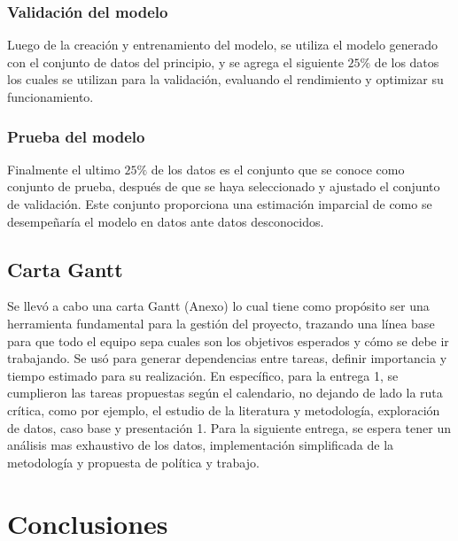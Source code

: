\documentclass[10pt]{article}
\begin{document}
\subsubsection{Validación del modelo}
Luego de la creación y entrenamiento del modelo, se utiliza el modelo generado con el conjunto de datos del principio, y se agrega el siguiente $25\%$ de los datos los cuales se utilizan para la validación, evaluando el rendimiento y optimizar su funcionamiento.

\subsubsection{Prueba del modelo}
 Finalmente el ultimo $25\%$ de los datos es el conjunto que se conoce como conjunto de prueba, después de que se haya seleccionado y ajustado el conjunto de validación. Este conjunto proporciona una estimación imparcial de como se desempeñaría el modelo en datos ante datos desconocidos.
 
\subsection{Carta Gantt}
Se llevó a cabo una carta Gantt (Anexo) lo cual tiene como propósito ser una herramienta fundamental para la gestión del proyecto, trazando una línea base para que todo el equipo sepa cuales son los objetivos esperados y cómo se debe ir trabajando. Se usó para generar dependencias entre tareas, definir importancia y tiempo estimado para su realización. En específico, para la entrega 1, se cumplieron las tareas propuestas según el calendario, no dejando de lado la ruta crítica, como por ejemplo, el estudio de la literatura y metodología, exploración de datos, caso base y presentación 1. Para la siguiente entrega, se espera tener un análisis mas exhaustivo de los datos, implementación simplificada de la metodología y propuesta de política y trabajo.

\section{Conclusiones}
\end{document}
